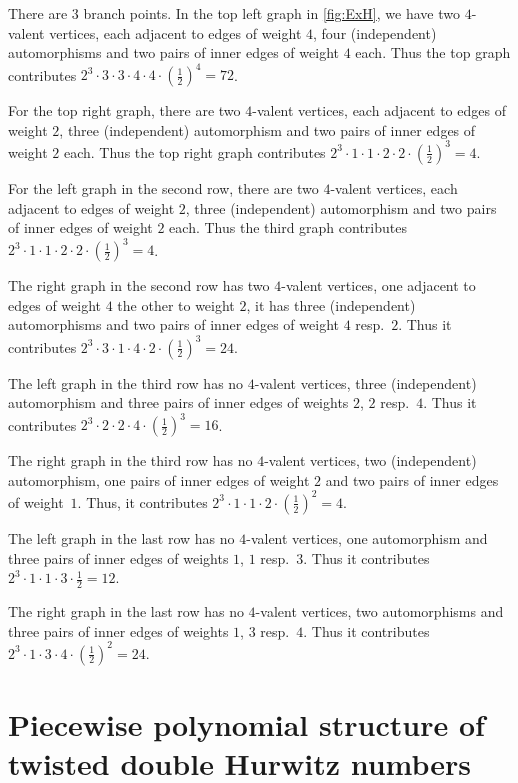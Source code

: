 \begin{exam}
There are $3$ branch points. In the top left graph in \cref{fig:ExH}, we have two $4$-valent vertices, each adjacent to edges of weight $4$, four (independent) automorphisms and two pairs of inner edges of weight $4$ each. Thus the top graph contributes $2^3 \cdot 3\cdot 3\cdot 4\cdot 4\cdot (\frac{1}{2})^4=72$.

For the top right graph, there are two $4$-valent vertices, each adjacent to edges of weight $2$, three (independent) automorphism and two pairs of inner edges of weight $2$ each. Thus the top right graph contributes $2^3\cdot 1\cdot 1\cdot 2\cdot 2\cdot (\frac{1}{2})^3=4$.

For the left graph in the second row, there are two $4$-valent vertices, each adjacent to edges of weight $2$, three (independent) automorphism and two pairs of inner edges of weight $2$ each. Thus the third graph contributes $2^3\cdot 1\cdot 1\cdot 2\cdot 2\cdot (\frac{1}{2})^3=4$.

The right graph in the second row has two $4$-valent vertices, one adjacent to edges of weight $4$ the other to weight $2$, it has three (independent) automorphisms and two pairs of inner edges of weight $4$ resp.\ $2$. Thus it contributes $2^3\cdot 3\cdot 1\cdot 4\cdot 2\cdot (\frac{1}{2})^3=24$.

The left graph in the third row has no $4$-valent vertices, three (independent) automorphism and three pairs of inner edges of weights $2$, $2$ resp.\ $4$. Thus it contributes $2^3\cdot 2\cdot 2\cdot 4\cdot (\frac{1}{2})^3=16$.

The right graph in the third row has no $4$-valent vertices, two (independent) automorphism, one pairs of inner edges of weight $2$ and two pairs of inner edges of weight~$1$. Thus, it contributes $2^3\cdot 1\cdot 1\cdot 2\cdot (\frac{1}{2})^2=4$.

The left graph in the last row has no $4$-valent vertices, one automorphism and three pairs of inner edges of weights $1$, $1$ resp.\ $3$. Thus it contributes $2^3\cdot 1\cdot 1\cdot 3\cdot \frac{1}{2}=12$.

The right graph in the last row has no $4$-valent vertices, two automorphisms and three pairs of inner edges of weights $1$, $3$ resp.\ $4$. Thus it contributes $2^3\cdot 1\cdot 3\cdot 4\cdot (\frac{1}{2})^2=24$.
\end{exam}

\section{Piecewise polynomial structure of twisted double Hurwitz numbers}
\label{sec:poly}


